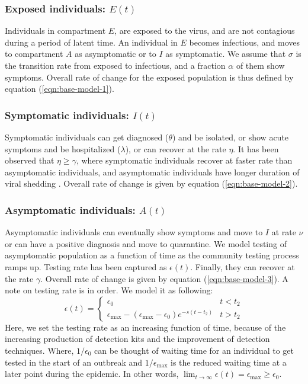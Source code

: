 \documentclass[fleqn,10pt]{wlscirep}
\begin{document}
\subsubsection*{Exposed individuals: $E(t)$}
Individuals in compartment $E$, are exposed to the virus, and are not contagious during a period of latent time. An individual in $E$ becomes infectious, and moves to compartment $A$ as asymptomatic or to $I$ as symptomatic. We assume that $\sigma$ is the transition rate from exposed to infectious, and a fraction $\alpha$ of them show symptoms. Overall rate of change for the exposed population is thus defined by equation (\ref{eqn:base-model-1}).

\subsubsection*{Symptomatic individuals: $I(t)$}
Symptomatic individuals can get diagnosed ($\theta$) and be isolated, or show acute symptoms and be hospitalized ($\lambda$), or can recover at the rate $\eta$. It has been observed that $\eta \geq \gamma$, where symptomatic individuals recover at faster rate than asymptomatic individuals, and asymptomatic individuals have longer duration of viral shedding \cite{Long2020}. Overall rate of change is given by equation (\ref{eqn:base-model-2}).

\subsubsection*{Asymptomatic individuals: $A(t)$}
Asymptomatic individuals can eventually show symptoms and move to $I$ at rate $\nu$ or can have a positive diagnosis and move to quarantine. We model testing of asymptomatic population as a function of time as the community testing process ramps up. Testing rate has been captured as $\epsilon(t)$. Finally, they can recover at the rate $\gamma$. Overall rate of change is given by equation (\ref{eqn:base-model-3}). A note on testing rate is in order. We model it as following:
%
%
\begin{equation}
\epsilon(t) = 
\begin{cases}
\epsilon_0 & t < t_2 \\
\epsilon_{\max} - (\epsilon_{\max} - \epsilon_0) e^{-s \left( t-t_2\right) } & t > t_2
\end{cases}
\label{eqn:base-model-13}
\end{equation}
%
%
Here, we set the testing rate as an increasing function of time, because of the increasing production of detection kits and the improvement of detection techniques. Where, $1/ \epsilon_0$ can be thought of waiting time for an individual to get tested in the start of an outbreak and $1/\epsilon_{\max}$ is the reduced waiting time at a later point during the epidemic. In other words, $\lim_{t \rightarrow \infty}  \epsilon(t) =  \epsilon_{\max} \geq \epsilon_0$.
%
%
\end{document}
